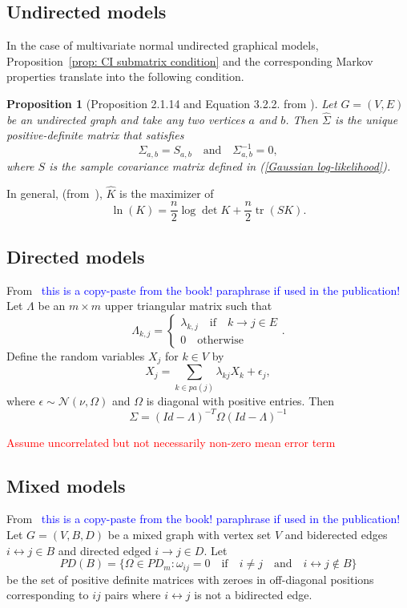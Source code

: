 \documentclass[10pt,a4paper]{article}
\newtheorem{proposition}{Proposition}
\begin{document}
\subsection{Undirected models}
In the case of multivariate normal undirected graphical models, Proposition~\ref{prop: CI submatrix condition} and the corresponding Markov properties translate into the following condition.

\begin{proposition}[Proposition 2.1.14 and Equation 3.2.2. from \cite{drton2008lectures}]
Let $G=(V,E)$ be an undirected graph and take any two vertices $a$ and $b$. Then $\hat{\Sigma}$ is the unique positive-definite matrix that satisfies
\[\Sigma_{a,b}=S_{a,b} \quad \text{and}\quad \Sigma^{-1}_{a,b}=0,\]
where $S$ is the sample covariance matrix defined in (\ref{Gaussian log-likelihood}).

\end{proposition}

In general, (from~\cite[Proposition 2.1.12]{drton2008lectures}), $\hat{K}$ is the maximizer of 
\begin{equation}
\ln(K)=\frac{n}{2}\log \det K+ \frac{n}{2}\operatorname{tr}(SK).
\end{equation}

\subsection{Directed models}
From~\cite[Section 13.2]{sullivant2018algebraic} 
\textcolor{blue}{this is a copy-paste from the book! paraphrase if used in the publication!}
Let $\Lambda$ be an $m \times m$ upper triangular matrix such that
\[
\Lambda_{k,j}=
	\begin{cases}
	\lambda_{k,j} \quad \text{if} \quad k \rightarrow j \in E\\
	0 \quad \text{otherwise}
	\end{cases}.
\]
Define the random variables $X_j$ for
$k \in V$ by
\[X_j=\sum\limits_{k \in pa(j)}\lambda_{kj}X_k+\epsilon_j,\]
where $\epsilon \sim \mathcal{N}(\nu, \Omega)$ and $\Omega$ is diagonal with positive entries. Then
\begin{equation}
\Sigma=(Id-\Lambda)^{-T}\Omega(Id-\Lambda)^{-1}
\end{equation}

\textcolor{red}{Assume uncorrelated but not necessarily non-zero mean error term}
\subsection{Mixed models}
From~\cite[Section 14.2]{sullivant2018algebraic} \textcolor{blue}{this is a copy-paste from the book! paraphrase if used in the publication!}
Let $G=(V,B,D)$ be a mixed graph with vertex set $V$ and biderected edges $i \leftrightarrow j \in B$ and directed edged $i \rightarrow j \in D$. Let 
\[PD(B) = \{ \Omega \in PD_m : \omega_{ij} = 0 \quad \text{if} \quad i \neq j\quad \text{and} \quad i \leftrightarrow j \notin B\}\]
be the set of positive definite matrices with zeroes in off-diagonal positions corresponding to $ij$ pairs where $i \leftrightarrow j$ is not a bidirected edge.
\end{document}
